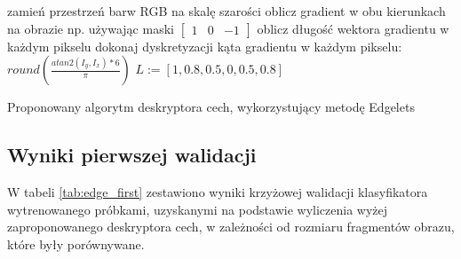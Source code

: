 \begin{algorithm}[H]
 \SetAlgoLined
 zamień przestrzeń barw RGB na skalę szarości\;
 oblicz gradient w obu kierunkach na obrazie np. używając maski  $\left[\begin{array}{ccc}1 & 0 & -1\end{array}\right]$\;
 oblicz długość wektora gradientu w każdym pikselu\;
 dokonaj dyskretyzacji kąta gradientu w każdym pikselu: $round(\frac{atan2(I_y, I_x)*6}{\pi})$\;
 $L := [1, 0.8, 0.5, 0, 0.5, 0.8]$\;
 \;
 \caption{Proponowany algorytm deskryptora cech, wykorzystujący metodę Edgelets}
\end{algorithm}

\subsection{Wyniki pierwszej walidacji}

W tabeli \ref{tab:edge_first} zestawiono wyniki krzyżowej walidacji klasyfikatora wytrenowanego 
próbkami, uzyskanymi na podstawie wyliczenia wyżej zaproponowanego deskryptora cech, w zależności od rozmiaru fragmentów obrazu, które były porównywane.

